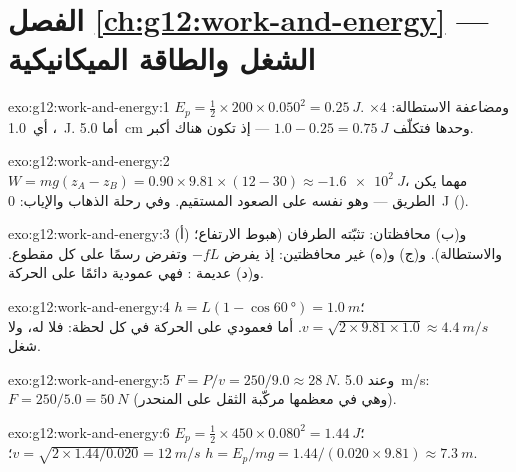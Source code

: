 \section*{الفصل \ref{ch:g12:work-and-energy} --- الشغل والطاقة الميكانيكية}

\begin{solution}{exo:g12:work-and-energy:1}
$E_p = \tfrac12 \times 200 \times 0.050^2 = \qty{0.25}{J}$. ومضاعفة
الاستطالة: $\times 4$، أي\ \qty{1.0}{J}. أما \qty{5.0}{cm} 
وحدها فتكلّف $1.0 - 0.25 = \qty{0.75}{J}$ --- إذ تكون  هناك أكبر.
\end{solution}

\begin{solution}{exo:g12:work-and-energy:2}
$W = mg(z_A - z_B) = 0.90 \times 9.81 \times (12 - 30) \approx
\qty{-1.6e2}{J}$، مهما يكن الطريق --- وهو نفسه على الصعود
المستقيم. وفي رحلة الذهاب والإياب: \qty{0}{J} ().
\end{solution}

\begin{solution}{exo:g12:work-and-energy:3}
(أ) و(ب) محافظتان:  تثبّته الطرفان (هبوط الارتفاع؛
والاستطالة). و(ج) و(ه) غير محافظتين: إذ يفرض $-fL$ وتفرض  رسمًا على كل 
مقطوع. و(د) عديمة : فهي عمودية دائمًا على الحركة.
\end{solution}

\begin{solution}{exo:g12:work-and-energy:4}
$h = L(1 - \cos\qty{60}{\degree}) = \qty{1.0}{m}$؛
$v = \sqrt{2 \times 9.81 \times 1.0} \approx \qty{4.4}{m/s}$. أما
 فعمودي على الحركة في كل لحظة: فلا  له،
ولا شغل.
\end{solution}

\begin{solution}{exo:g12:work-and-energy:5}
$F = P/v = 250/9.0 \approx \qty{28}{N}$. وعند \qty{5.0}{m/s}:
$F = 250/5.0 = \qty{50}{N}$ (وهي في معظمها مركّبة الثقل على المنحدر).
\end{solution}

\begin{solution}{exo:g12:work-and-energy:6}
$E_p = \tfrac12 \times 450 \times 0.080^2 = \qty{1.44}{J}$؛
$v = \sqrt{2 \times 1.44/0.020} = \qty{12}{m/s}$؛
$h = E_p/mg = 1.44/(0.020 \times 9.81) \approx \qty{7.3}{m}$.
\end{solution}

